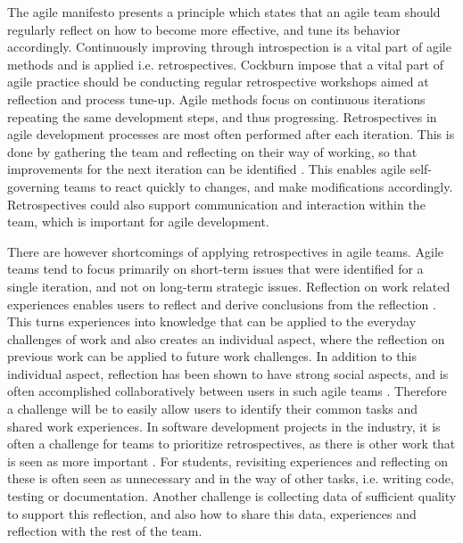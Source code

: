 The agile manifesto presents a principle which states that an agile team should regularly reflect on how to become more effective, and tune its behavior accordingly\citep{Beck2001}. Continuously improving through introspection is a vital part of agile methods and is applied i.e. retrospectives\citep{Beck1999, Derby2006, Maham2008}. Cockburn impose that a vital part of agile practice should be conducting regular retrospective workshops aimed at reflection and process tune-up\citep{Cockburn2006}. Agile methods focus on continuous iterations repeating the same development steps, and thus progressing. Retrospectives in agile development processes are most often performed after each iteration. This is done by gathering the team and reflecting on their way of working, so that improvements for the next iteration can be identified \citep{Derby2006, Drury2011}. This enables agile self-governing teams to react quickly to changes, and make modifications accordingly\citep{Drury2011}. Retrospectives could also support communication and interaction within the team, which is important for agile development. 
 
There are however shortcomings of applying retrospectives in agile teams. Agile teams tend to focus primarily on short-term issues that were identified for a single iteration, and not on long-term strategic issues\citep{Drury2011}. Reflection on work related experiences enables users to reflect and derive conclusions from the reflection \citep{Korthagen_Vasalos_2005}. This turns experiences into knowledge that can be applied to the everyday challenges of work and also creates an individual aspect, where the reflection on previous work can be applied to future work challenges. In addition to this individual aspect, reflection has been shown to have strong social aspects, and is often accomplished collaboratively between users in such agile teams \citep{Hoeyrup_2004}. Therefore a challenge will be to easily allow users to identify their common tasks and shared work experiences. In software development projects in the industry, it is often a challenge for teams to prioritize retrospectives, as there is other work that is seen as more important \citep{kasi2008post}. For students, revisiting experiences and reflecting on these is often seen as unnecessary and in the way of other tasks, i.e. writing code, testing or documentation. Another challenge is collecting data of sufficient quality to support this reflection, and also how to share this data, experiences and reflection with the rest of the team.  

